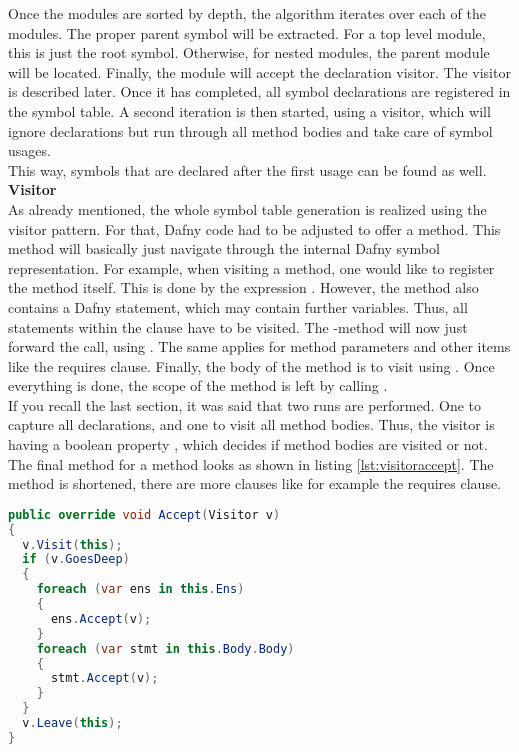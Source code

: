 Once the modules are sorted by depth, the algorithm iterates over each of the modules.
The proper parent symbol will be extracted.
For a top level module, this is just the root symbol.
Otherwise, for nested modules, the parent module will be located.
Finally, the module will accept the declaration visitor.
The visitor is described later.
Once it has completed, all symbol declarations are registered in the symbol table.
A second iteration is then started, using a visitor, which will ignore declarations but run through all method bodies and take care of symbol usages.\\
This way, symbols that are declared after the first usage can be found as well.\\

\textbf{Visitor}\\
As already mentioned, the whole symbol table generation is realized using the visitor pattern.
For that, Dafny code had to be adjusted to offer a  method.
This method will basically just navigate through the internal Dafny symbol representation.
For example, when visiting a method, one would like to register the method itself.
This is done by the expression .
However, the method also contains a Dafny  statement, which may contain further variables.
Thus, all statements within the  clause have to be visited.
The -method will now just forward the call, using .
The same applies for method parameters and other items like the requires clause.
Finally, the body of the method is to visit using .
Once everything is done, the scope of the method is left by calling .\\

If you recall the last section, it was said that two runs are performed.
One to capture all declarations, and one to visit all method bodies.
Thus, the visitor is having a boolean property , which decides if method bodies are visited or not.
The final  method for a method looks as shown in listing \ref{lst:visitoraccept}.
The method is shortened, there are more clauses like for example the requires clause.


\begin{lstlisting}[language=csharp, caption={Accepting a Visitor}, captionpos=b, label={lst:visitoraccept}]
public override void Accept(Visitor v)
{
  v.Visit(this);
  if (v.GoesDeep)
  {
    foreach (var ens in this.Ens)
    {
      ens.Accept(v);
    }
    foreach (var stmt in this.Body.Body)
    {
      stmt.Accept(v);
    }
  }
  v.Leave(this);
}
\end{lstlisting}

